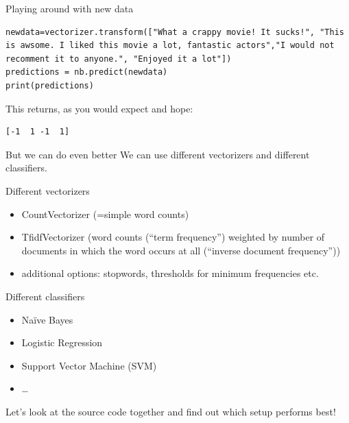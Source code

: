 \documentclass[handout]{beamer}
\begin{document}
\begin{frame}[fragile]{Playing around with new data}
\begin{lstlisting}
newdata=vectorizer.transform(["What a crappy movie! It sucks!", "This is awsome. I liked this movie a lot, fantastic actors","I would not recomment it to anyone.", "Enjoyed it a lot"])
predictions = nb.predict(newdata)
print(predictions)
\end{lstlisting}
This returns, as you would expect and hope:
\begin{lstlisting} 
[-1  1 -1  1]
\end{lstlisting}


\end{frame}




\begin{frame}{But we can do even better}
	We can use different vectorizers and different classifiers.
\end{frame}

\begin{frame}{Different vectorizers}
	\begin{itemize}
		\item CountVectorizer (=simple word counts)
		\item TfidfVectorizer (word counts (``term frequency'') weighted by number of documents in which the word occurs at all (``inverse document frequency''))
		\item additional options: stopwords, thresholds for minimum frequencies etc.
	\end{itemize}
\end{frame}

\begin{frame}{Different classifiers}
	\begin{itemize}
		\item Naïve Bayes
		\item Logistic Regression
		\item Support Vector Machine (SVM)
		\item \ldots
	\end{itemize}
\end{frame}





\begin{frame}[plain]
	Let's look at the source code together and find out which setup performs best!
\end{frame}
\end{document}
